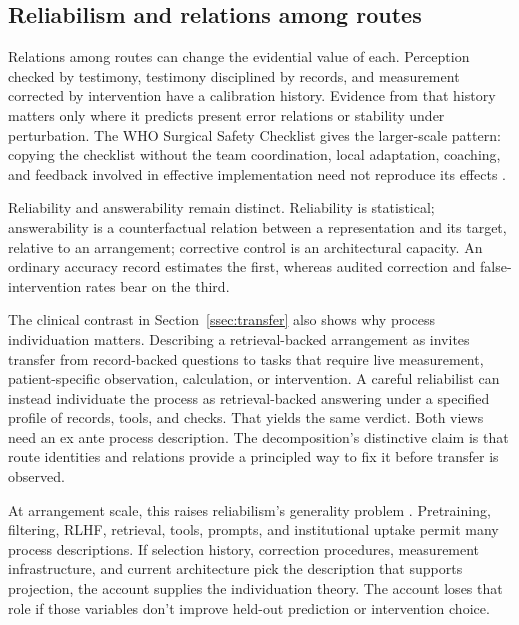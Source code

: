 \documentclass[12pt]{article}
\begin{document}
\subsection{Reliabilism and relations among routes}

Relations among routes can change the evidential value of each. Perception checked by
testimony, testimony disciplined by records, and measurement corrected by intervention
have a calibration history. Evidence from that history matters only where it
predicts present error relations or stability under perturbation. The WHO Surgical Safety
Checklist gives the larger-scale pattern: copying the checklist without the team
coordination, local adaptation, coaching, and feedback involved in effective
implementation need not reproduce its effects
\citep{who_2009_surgical_safety_checklist,armstrong_etal_2022_surgical_safety_checklist}.

Reliability and answerability remain distinct. Reliability is statistical;
answerability is a counterfactual relation between a representation and its target,
relative to an arrangement; corrective control is an architectural capacity. An ordinary
accuracy record estimates the first, whereas audited correction and false-intervention
rates bear on the third.

The clinical contrast in Section~\ref{ssec:transfer} also shows why process individuation
matters. Describing a retrieval-backed arrangement as  invites transfer from record-backed questions to tasks that
require live measurement, patient-specific observation, calculation, or intervention. A
careful reliabilist can instead individuate the process as retrieval-backed answering under
a specified profile of records, tools, and checks. That yields the same verdict.
Both views need an ex ante process description. The decomposition's distinctive
claim is that route identities and relations provide a principled way to fix it before
transfer is observed.

At arrangement scale, this raises reliabilism's generality problem
\citep{conee_feldman_1998_generality_problem_reliabilism}. Pretraining, filtering, RLHF,
retrieval, tools, prompts, and institutional uptake permit many process descriptions. If
selection history, correction procedures, measurement infrastructure, and current
architecture pick the description that supports projection, the account supplies the individuation
theory. The account loses that role if those variables don't improve held-out prediction or
intervention choice.
\end{document}
